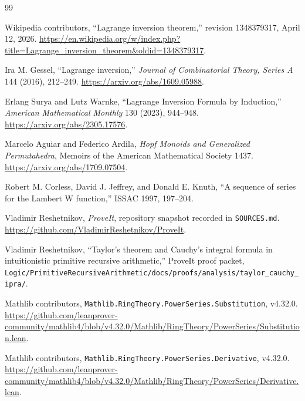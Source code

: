\documentclass[11pt]{article}
\theoremstyle{definition}
\newcommand{\code}[1]{\texttt{#1}}
\begin{document}
\begin{thebibliography}{99}

Wikipedia contributors,
``Lagrange inversion theorem,'' revision 1348379317, April 12, 2026.
\url{https://en.wikipedia.org/w/index.php?title=Lagrange_inversion_theorem&oldid=1348379317}.

Ira M. Gessel,
``Lagrange inversion,''
\emph{Journal of Combinatorial Theory, Series A} 144 (2016), 212--249.
\url{https://arxiv.org/abs/1609.05988}.

Erlang Surya and Lutz Warnke,
``Lagrange Inversion Formula by Induction,''
\emph{American Mathematical Monthly} 130 (2023), 944--948.
\url{https://arxiv.org/abs/2305.17576}.

Marcelo Aguiar and Federico Ardila,
\emph{Hopf Monoids and Generalized Permutahedra},
Memoirs of the American Mathematical Society 1437.
\url{https://arxiv.org/abs/1709.07504}.

Robert M. Corless, David J. Jeffrey, and Donald E. Knuth,
``A sequence of series for the Lambert W function,''
ISSAC 1997, 197--204.

Vladimir Reshetnikov,
\emph{ProveIt}, repository snapshot recorded in \code{SOURCES.md}.
\url{https://github.com/VladimirReshetnikov/ProveIt}.

Vladimir Reshetnikov,
``Taylor's theorem and Cauchy's integral formula in intuitionistic primitive
recursive arithmetic,'' ProveIt proof packet,
\code{Logic/PrimitiveRecursiveArithmetic/docs/proofs/analysis/taylor\_cauchy\_ipra/}.

Mathlib contributors,
\code{Mathlib.RingTheory.PowerSeries.Substitution}, v4.32.0.
\url{https://github.com/leanprover-community/mathlib4/blob/v4.32.0/Mathlib/RingTheory/PowerSeries/Substitution.lean}.

Mathlib contributors,
\code{Mathlib.RingTheory.PowerSeries.Derivative}, v4.32.0.
\url{https://github.com/leanprover-community/mathlib4/blob/v4.32.0/Mathlib/RingTheory/PowerSeries/Derivative.lean}.

\end{thebibliography}
\end{document}
